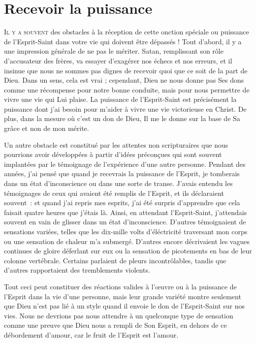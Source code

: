\chapter{Recevoir la puissance}

\lettrine{I}{l y a souvent} des obstacles à la réception de cette onction
 spéciale ou puissance de l'Esprit-Saint dans votre vie qui doivent
 être dépassés ! Tout d'abord, il y a une impression générale
 de ne pas le mériter. Satan,  remplissant son rôle d'accusateur
 des frères, va essayer d'exagérer nos échecs et nos erreurs,
 et il insinue que nous ne sommes pas dignes de recevoir quoi que ce soit
 de la part de Dieu. Dans un sens, cela est vrai ;
 cependant, Dieu ne nous donne pas Ses dons comme une récompense
 pour notre bonne conduite, mais pour nous permettre de vivre une vie
 qui Lui plaise. La puissance de l'Esprit-Saint est précisément
 la puissance dont j'ai besoin pour m'aider à vivre une vie victorieuse
 en Christ. De plus, dans la mesure où c'est un don de Dieu,
 Il me le donne sur la base de Sa grâce et non de mon mérite.

Un autre obstacle est constitué par les attentes non scripturaires
 que nous pourrions avoir développées à partir d'idées préconçues
 qui sont souvent implantées par le témoignage de l'expérience 
 d'une autre personne. Pendant des années, j'ai pensé que
 quand je recevrais la puissance de l'Esprit, je tomberais dans un état
 d'inconscience ou dans une sorte de transe.
 J'avais entendu les témoignages de ceux qui avaient été remplis de l'Esprit,
 et ils déclaraient souvent~: \og [\dots{}] et quand j'ai repris mes esprits,
 j'ai été surpris d'apprendre que cela faisait quatre heures
 que j'étais là. \fg{}
 Ainsi, en attendant l'Esprit-Saint, j'attendais souvent en vain
 de glisser dans un état d'inconscience.
 D'autres témoignaient de sensations variées, telles que
 \og les dix-mille volts d'éléctricité traversant mon corps \fg{} ou
 \og une sensation de chaleur m'a submergé. \fg{}
 D'autres encore décrivaient les vagues continues de gloire déferlant
 sur eux ou la sensation de picotements en bas de leur colonne vertébrale.
 Certains parlaient de pleurs incontrôlables,
 tandis que d'autres rapportaient des tremblements violents.

Tout ceci peut constituer des réactions valides à l'œuvre
 ou à la puissance de l'Esprit dans la vie d'une personne,
 mais leur grande variété montre seulement que Dieu n'est pas lié
 à un style quand il envoie le don de l'Esprit-Saint sur nos vies.
 Nous ne devrions pas nous attendre à un quelconque type de sensation
 comme une preuve que Dieu nous a rempli de Son Esprit,
 en dehors de ce débordement d'amour, car le fruit de l'Esprit est l'amour.


